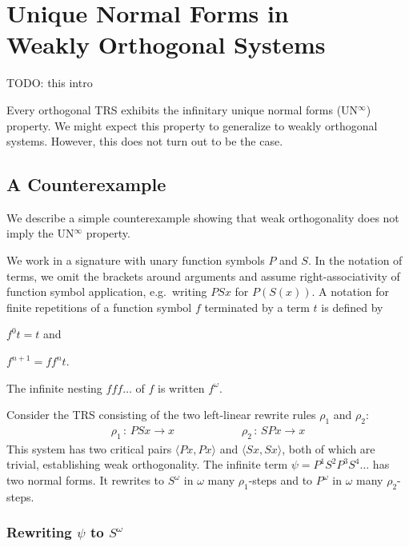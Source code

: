 \chapter[\texorpdfstring{UN$^\infty$ in Weakly Orthogonal Systems}{UN
  in Weakly Orthogonal Systems}]{\texorpdfstring{Unique Normal Forms
    in\\Weakly Orthogonal Systems}{Unique Normal Forms in Weakly
    Orthogonal Systems}}\label{chap:unwo}

TODO: this intro

Every orthogonal TRS exhibits the infinitary unique normal forms
(UN$^\infty$) property. We might expect this property to generalize to
weakly orthogonal systems. However, this does not turn out to be the
case.


\section{A Counterexample}

We describe a simple counterexample showing that weak orthogonality
does not imply the UN$^\infty$ property.

We work in a signature with unary function symbols $P$ and $S$. In the
notation of terms, we omit the brackets around arguments and assume
right-associativity of function symbol application, e.g.\ writing
$PSx$ for $P(S(x))$. A notation for finite repetitions of a function
symbol $f$ terminated by a term $t$ is defined by
\begin{inparaenum}[(i)]
\item $f^0 t = t$ and
\item $f^{n+1} = ff^nt$.
\end{inparaenum}
The infinite nesting $fff \ldots$ of $f$ is written $f^\omega$.

Consider the TRS consisting of the two left-linear rewrite rules
$\rho_1$ and $\rho_2$:
\begin{align*}
  \rho_1 \, : \, PSx \to x \qquad \qquad \qquad
  \rho_2 \, : \, SPx \to x
\end{align*}
This system has two critical pairs $\langle Px, Px \rangle$ and
$\langle Sx, Sx \rangle$, both of which are trivial, establishing
weak orthogonality. The infinite term $\psi = P^1 S^2 P^3 S^4 \ldots$
has two normal forms. It rewrites to $S^\omega$ in $\omega$ many
$\rho_1$-steps and to $P^\omega$ in $\omega$ many $\rho_2$-steps.


\subsection{\texorpdfstring{Rewriting $\psi$ to $S^\omega$}{Rewriting
    PSSPPP... to SSS...}}

